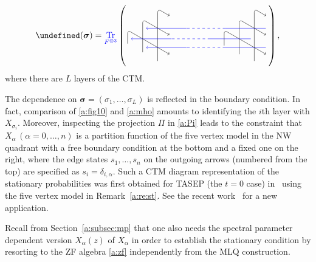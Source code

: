 \documentclass[11pt]{article}
\theoremstyle{definition}
\numberwithin{equation}{section}
\let\prob\undefined
\newcommand{\prob}{P}
\DeclareMathOperator{\tr}{Tr}
\begin{document}
\begin{equation}
\label{a:fig10}
\prob({\boldsymbol\sigma}) = {\color{blue}\tr_{F^{\otimes 3}}} \left(\,
\begin{tikzpicture}[scale=.8,baseline=1.2cm]
\draw[->,rounded corners] (0,0.3) -- ++(0,2.7) -- ++(-30:.7);
\draw[->,rounded corners] ++(150:.9) + (0,0.3) -- ++(0,2) -- ++(-30:1.6);
\draw[->,rounded corners] ++(150:1.8) + (0,0.3) -- ++(0,1) -- ++(-30:2.5);
\draw[->,rounded corners] ++(5,0.3) -- ++(0,2.7) -- ++(-30:.7);
\draw[->,rounded corners] ++(5,0) ++(150:.9) + (0,0.2) -- ++(0,2) -- ++(-30:1.6);
\draw[->,rounded corners] ++(5,0) ++(150:1.8) + (0,0.2) -- ++(0,1) -- ++(-30:2.5);
%
\draw[-,blue] (5.6,1) -- (3.5,1);
\draw[dashed,blue] (3.5,1) -- (1.5,1);
\draw[->,blue] (1.5,1) -- (-.6,1);
\draw[-,blue] (5.6,2) -- (3.5,2);
\draw[dashed,blue] (3.5,2) -- (1.5,2);
\draw[->,blue] (1.5,2) -- (-.6,2);
\draw[-,blue] ++(0,2) ++ (150:.9) + (5.6,-1) -- +(3.5,-1);
\draw[dashed,blue] ++(0,2) ++ (150:.9) + (3.5,-1) -- +(1.5,-1);
\draw[->,blue] ++(0,2) ++ (150:.9) + (1.5,-1) -- +(-.6,-1);
\end{tikzpicture}
\;\right),
\end{equation}
where there are $L$ layers of the CTM.

The dependence on ${\boldsymbol \sigma}=(\sigma_1, \ldots, \sigma_L)$ 
is reflected in the boundary condition.
In fact, comparison of \eqref{a:fig10} and \eqref{a:mho} amounts to identifying the 
$i$th layer with $X_{\sigma_i}$.
Moreover, inspecting the projection $\Pi$ in \eqref{a:Pi} leads to the constraint that 
$X_\alpha\, (\alpha = 0,\ldots, n)$ is a partition function of the five vertex model 
in the NW quadrant 
with a free boundary condition at the bottom and a fixed one on the right, 
where the edge states $s_1,\ldots, s_n$ on the outgoing arrows (numbered from the top) 
are specified as $s_i=\delta_{i,\alpha}$. 
Such a CTM diagram representation of the stationary probabilities was first obtained for TASEP 
(the $t=0$ case)  in~\cite{KMO1,KMO2} using the five vertex model in Remark~\ref{a:re:st}.
See the recent work~\cite{IMO} for a new application.

Recall from Section~\ref{a:subsec:mp} that one also needs the spectral parameter dependent version 
$X_\alpha(z)$ of $X_\alpha$ in order to establish the stationary condition 
by resorting to the ZF algebra \eqref{a:zf} independently from the MLQ construction.
\end{document}
